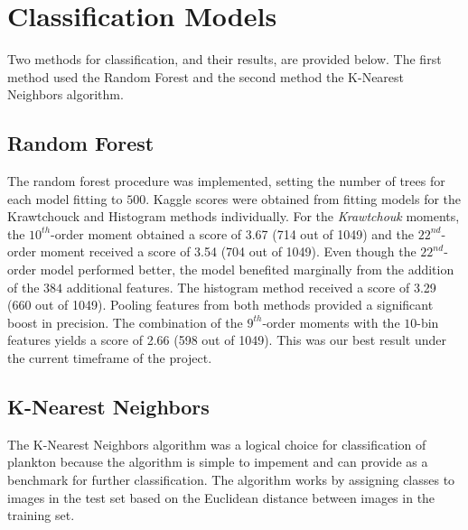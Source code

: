 \documentclass[12pt]{article}
\begin{document}
\section{Classification Models}

Two methods for classification, and their results, are provided below. The first method used the Random Forest and the second method the K-Nearest Neighbors algorithm. 

\subsection{Random Forest}
The random forest procedure was implemented, setting the number of trees for each model fitting to $500$. Kaggle scores were obtained from fitting models for the Krawtchouck and Histogram methods individually. For the \textit{Krawtchouk} moments, the $10^{th}$-order moment obtained a score of 3.67 (714 out of 1049) and the $22^{nd}$-order moment received a score of 3.54 (704 out of 1049). Even though the $22^{nd}$-order model performed better, the model benefited marginally from the addition of the $384$ additional features. The histogram method received a score of 3.29 (660 out of 1049). Pooling features from both methods provided a significant boost in precision. The combination of the $9^{th}$-order moments with the $10$-bin features yields a score of 2.66 (598 out of 1049). This was our best result under the current timeframe of the project.

\subsection{K-Nearest Neighbors}

The K-Nearest Neighbors algorithm was a logical choice for classification of plankton because the algorithm is simple to impement and can provide as a benchmark for further classification. The algorithm works by assigning classes to images in the test set based on the Euclidean distance between images in the training set. \\
\end{document}
